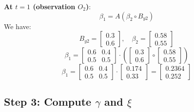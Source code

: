   \textbf{At \( t = 1 \) (observation \( O_2 \))}:
  \[
  \beta_1 = A (\beta_2 \circ B_{y2}) 
  \]
  We have:
  \[
  B_{y2} = \begin{bmatrix} 0.3 \\ 0.6 \end{bmatrix}, \quad \beta_2 = \begin{bmatrix} 0.58 \\ 0.55 \end{bmatrix}
  \]
  \[
  \beta_1 = \begin{bmatrix} 0.6 & 0.4 \\ 0.5 & 0.5 \end{bmatrix} \cdot \left(\begin{bmatrix} 0.3 \\ 0.6 \end{bmatrix} \circ \begin{bmatrix} 0.58 \\ 0.55 \end{bmatrix}\right) 
  \]
  \[
  \beta_1 = \begin{bmatrix} 0.6 & 0.4 \\ 0.5 & 0.5 \end{bmatrix} \cdot \begin{bmatrix} 0.174 \\ 0.33 \end{bmatrix} = \begin{bmatrix} 0.2364 \\ 0.252\end{bmatrix}
  \]

\subsection{Step 3: Compute \( \gamma \) and \( \xi \)}

